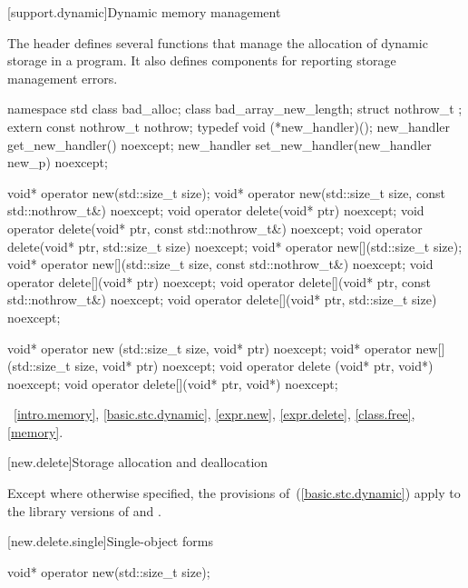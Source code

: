 [support.dynamic]{Dynamic memory management}

\pnum
The header
defines several
functions that manage the allocation of dynamic storage in a program.
It also defines components for reporting storage management errors.

%
%

\begin{codeblock}
namespace std {
  class bad_alloc;
  class bad_array_new_length;
  struct nothrow_t {};
  extern const nothrow_t nothrow;
  typedef void (*new_handler)();
  new_handler get_new_handler() noexcept;
  new_handler set_new_handler(new_handler new_p) noexcept;
}

void* operator new(std::size_t size);
void* operator new(std::size_t size, const std::nothrow_t&) noexcept;
void  operator delete(void* ptr) noexcept;
void  operator delete(void* ptr, const std::nothrow_t&) noexcept;
void  operator delete(void* ptr, std::size_t size) noexcept;
void* operator new[](std::size_t size);
void* operator new[](std::size_t size, const std::nothrow_t&) noexcept;
void  operator delete[](void* ptr) noexcept;
void  operator delete[](void* ptr, const std::nothrow_t&) noexcept;
void  operator delete[](void* ptr, std::size_t size) noexcept;

void* operator new  (std::size_t size, void* ptr) noexcept;
void* operator new[](std::size_t size, void* ptr) noexcept;
void  operator delete  (void* ptr, void*) noexcept;
void  operator delete[](void* ptr, void*) noexcept;
\end{codeblock}

\xref~\ref{intro.memory}, \ref{basic.stc.dynamic},
\ref{expr.new}, \ref{expr.delete}, \ref{class.free},
\ref{memory}.

[new.delete]{Storage allocation and deallocation}

\pnum
Except where otherwise specified, the provisions of~(\ref{basic.stc.dynamic})
apply to the library versions of  and .

[new.delete.single]{Single-object forms}

%
\begin{itemdecl}
void* operator new(std::size_t size);
\end{itemdecl}

